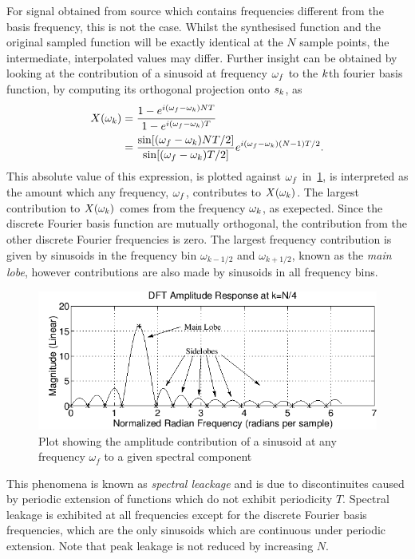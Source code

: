 For signal obtained from source which contains frequencies different from the basis frequency, this is not the case. Whilst the synthesised function and the original sampled function will be exactly identical at the $N$ sample points, the intermediate, interpolated values may differ.
Further insight can be obtained by looking at the contribution of a sinusoid at frequency $\omega_f$ to the $k$th fourier basis function, by computing its orthogonal projection onto $s_k$, as
\begin{align*}
  X(\omega_k) &= \frac{ 1 - e^{i (\omega_f -
\omega_k) N T} }{1 - e^{i(\omega_f - \omega_k) T}} \\ &= \frac{ \sin[(\omega_f -
\omega_k)N T / 2]}{\sin[(\omega_f - \omega_k) T / 2]} e^{i (\omega_f - \omega_k)
(N - 1) T /2} .
\end{align*}
This absolute value of this expression, is plotted against $\omega_f$ in~\ref{fig:amplitude-contribution-to-component-by-freq}, is interpreted as the amount which any frequency, $\omega_f$, contributes to $X(\omega_{k})$. The largest contribution to $X(\omega_{k})$ comes from the frequency $\omega_{k}$, as exepected. Since the discrete Fourier basis function are mutually orthogonal, the contribution from the other discrete Fourier frequencies is zero. The largest frequency contribution is given by sinusoids in the frequency bin $\omega_{k - 1/2}$ and $\omega_{k+1/2}$, known as the \textit{main lobe}, however contributions are also made by sinusoids in all frequency bins.
\begin{figure}[h] \centering
  \includegraphics[width=\textwidth]{Figures/Chapters/SignalAnalysis/spectralLeakage}
  \caption{Plot showing the amplitude contribution of a sinusoid at any frequency $\omega_f$ to a given spectral component}
  \label{fig:amplitude-contribution-to-component-by-freq}
\end{figure}
This phenomena is known as \textit{spectral leackage} and is due to
discontinuites caused by periodic extension of functions which do not exhibit
periodicity $T$. Spectral leakage is exhibited at all frequencies
except for the discrete Fourier basis frequencies, which are the only sinusoids
which are continuous under periodic extension. Note that peak leakage is not reduced by increasing $N$\cite{}.

